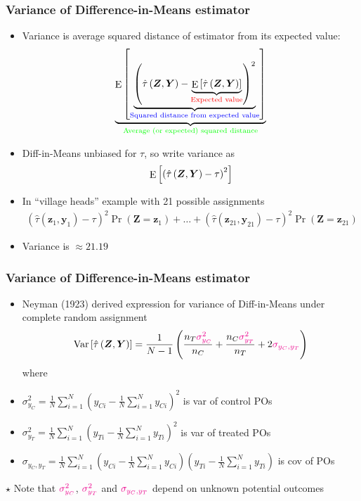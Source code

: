 \documentclass[table, xcolor = {dvipsnames}, 9pt]{beamer}
\theoremstyle{plain}
\newcommand{\mh}[1]{{\color{magenta}{#1}}}
\DeclareMathOperator{\E}{\rm{E}}
\DeclareMathOperator{\Var}{\rm{Var}}
\begin{document}
\begin{frame}
\frametitle{Variance of Difference-in-Means estimator} 
\begin{itemize}
\item Variance is average squared distance of estimator from its expected value:  
\begin{equation*}
\underbrace{\E\left[\underbrace{\left(\hat{\tau}\left(\bm{Z}, \bm{Y}\right) - \underbrace{\E\left[\hat{\tau}\left(\bm{Z}, \bm{Y}\right)\right]}_{\color{red}{\text{Expected value}}}\right)^2}_{\color{blue}{\text{Squared distance from expected value}}}\right]}_{\color{green}{\text{Average (or expected) squared distance}}}
\end{equation*} \pause
\item Diff-in-Means unbiased for $\tau$, so write variance as 
\begin{equation*}
\E\left[\left(\hat{\tau}\left(\bm{Z}, \bm{Y}\right) - \tau\right)^2\right]
\end{equation*} \pause
\item In ``village heads'' example with 21 possible assignments
\begin{align*}
\left(\hat{\tau}\left(\bm{z}_1, \bm{y}_1\right) - \tau\right)^2 \Pr\left(\bm{Z} = \bm{z}_1\right) + \ldots + \left(\hat{\tau}\left(\bm{z}_{21}, \bm{y}_{21}\right) - \tau\right)^2 \Pr\left(\bm{Z} = \bm{z}_{21}\right)
\end{align*}  
\item[] Variance is $\approx 21.19$
\end{itemize}
\end{frame}
\begin{frame}
\frametitle{Variance of Difference-in-Means estimator}
\begin{itemize}
\item Neyman (1923) derived expression for variance of Diff-in-Means under complete random assignment
\begin{equation*}
\Var\left[\hat{\tau}\left(\bm{Z}, \bm{Y}\right)\right] = \frac{1}{N - 1}\left(\frac{n_T \mh{\sigma^2_{y_C}}}{n_C} + \frac{n_C \mh{\sigma^2_{y_T}}}{n_T} + 2\mh{\sigma_{y_C, y_T}}\right)
\end{equation*}  
where 
\item[] $\sigma^2_{y_C} = \frac{1}{N} \sum \limits_{i = 1}^N \left(y_{Ci} - \frac{1}{N} \sum \limits_{i = 1}^N y_{Ci}\right)^2$ is var of control POs
\item[] $\sigma^2_{y_T} = \frac{1}{N} \sum \limits_{i = 1}^N \left(y_{Ti} - \frac{1}{N} \sum \limits_{i = 1}^N y_{Ti}\right)^2$ is var of treated POs
\item[] $\sigma_{y_C, y_T} = \frac{1}{N} \sum \limits_{i = 1}^N \left(y_{Ci} - \frac{1}{N} \sum \limits_{i = 1}^N y_{Ci}\right)\left(y_{Ti} - \frac{1}{N} \sum \limits_{i = 1}^N y_{Ti}\right)$ is cov of POs
\end{itemize} \pause
\vspace{1em}
$\star$ Note that $\mh{\sigma^2_{y_C}}$, $\mh{\sigma^2_{y_T}}$ and $\mh{\sigma_{y_C, y_T}}$ depend on unknown potential outcomes
\end{frame}
\end{document}
